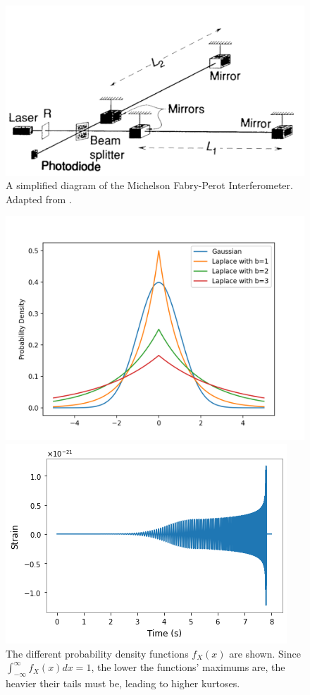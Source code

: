 \documentclass[preprint,
letterpaper,
 amsmath,amssymb,
 aps,
]{revtex4-2}
\begin{document}
\begin{figure}
\includegraphics[width = .6\textwidth]{Interferometer.png}
\caption{A simplified diagram of the Michelson Fabry-Perot Interferometer. Adapted from \cite{JSTORLIGO}.}
\centering
\end{figure} 
\begin{figure}[!tbp]
  \centering
  \begin{minipage}[b]{0.48\textwidth}
    \includegraphics[width = \textwidth]{pdf graphs.png}
    \caption{The different probability density functions $f_X(x)$ are shown. Since $\int_{-\infty}^\infty f_X(x)dx = 1$, the lower the  functions' maximums are, the heavier their tails must be, leading to higher kurtoses.}
  \end{minipage}
  \hfill
  \begin{minipage}[b]{0.48\textwidth}
    \includegraphics[width = \textwidth]{template.png}

\end{minipage}
\end{figure}
\end{document}
